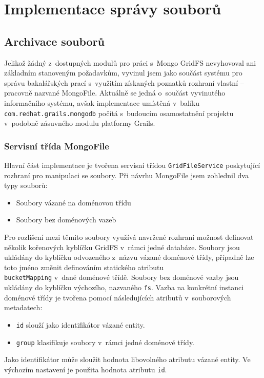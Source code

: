 \chapter{Implementace správy souborů}

\section{Archivace souborů}
Jelikož žádný z~dostupných modulů pro práci s~Mongo GridFS nevyhovoval ani základním stanoveným požadavkům, vyvinul jsem jako součást systému pro správu bakalářských prací s~využitím získaných poznatků rozhraní vlastní -- pracovně nazvané MongoFile. Aktuálně se jedná o~součást vyvinutého informačního systému, avšak implementace umístěná v~balíku \texttt{com.redhat.grails.mongodb} počítá s~budoucím osamostatnění projektu v~podobně zásuvného modulu platformy Grails.

\subsection{Servisní třída MongoFile}
Hlavní část implementace je tvořena servisní třídou \texttt{GridFileService} poskytující rozhraní pro manipulaci se soubory. Při návrhu MongoFile jsem zohlednil dva typy souborů:
\begin{itemize}
\item Soubory vázané na doménovou třídu
\item Soubory bez doménových vazeb
\end{itemize}
Pro rozlišení mezi těmito soubory využívá navržené rozhraní možnost definovat několik kořenových kyblíčku GridFS v~rámci jedné databáze. Soubory jsou ukládány do kyblíčku odvozeného z~názvu vázané doménové třídy, případně lze toto jméno změnit definováním statického atributu
\\\texttt{bucketMapping} v~dané doménové třídě. Soubory bez doménové vazby jsou ukládány do kyblíčku výchozího, nazvaného \texttt{fs}. Vazba na konkrétní instanci doménové třídy je tvořena pomocí následujících atributů v~souborových metadatech:
\begin{itemize}
\item \texttt{id} slouží jako identifikátor vázané entity.
\item \texttt{group} klasifikuje soubory v~rámci jedné doménové třídy.
\end{itemize}
Jako identifikátor může sloužit hodnota libovolného atributu vázané entity. Ve výchozím nastavení je použita hodnota atributu \texttt{id}.

